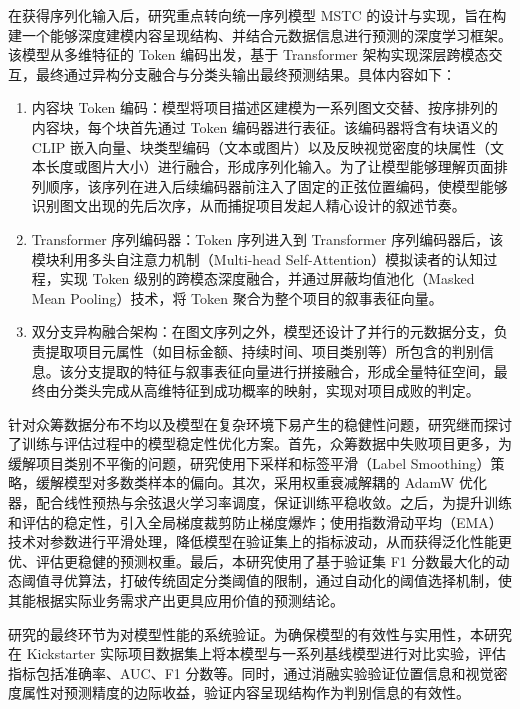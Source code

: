 在获得序列化输入后，研究重点转向统一序列模型 MSTC 的设计与实现，旨在构建一个能够深度建模内容呈现结构、并结合元数据信息进行预测的深度学习框架。该模型从多维特征的 Token 编码出发，基于 Transformer 架构实现深层跨模态交互，最终通过异构分支融合与分类头输出最终预测结果。具体内容如下：

\begin{enumerate}
\def\labelenumi{(\arabic{enumi})}
\item
  内容块 Token 编码：模型将项目描述区建模为一系列图文交替、按序排列的内容块，每个块首先通过 Token 编码器进行表征。该编码器将含有块语义的 CLIP 嵌入向量、块类型编码（文本或图片）以及反映视觉密度的块属性（文本长度或图片大小）进行融合，形成序列化输入。为了让模型能够理解页面排列顺序，该序列在进入后续编码器前注入了固定的正弦位置编码，使模型能够识别图文出现的先后次序，从而捕捉项目发起人精心设计的叙述节奏。
\item
  Transformer 序列编码器：Token 序列进入到 Transformer 序列编码器后，该模块利用多头自注意力机制（Multi-head Self-Attention）模拟读者的认知过程，实现 Token 级别的跨模态深度融合，并通过屏蔽均值池化（Masked Mean Pooling）技术，将 Token 聚合为整个项目的叙事表征向量。
\item
  双分支异构融合架构：在图文序列之外，模型还设计了并行的元数据分支，负责提取项目元属性（如目标金额、持续时间、项目类别等）所包含的判别信息。该分支提取的特征与叙事表征向量进行拼接融合，形成全量特征空间，最终由分类头完成从高维特征到成功概率的映射，实现对项目成败的判定。
\end{enumerate}

针对众筹数据分布不均以及模型在复杂环境下易产生的稳健性问题，研究继而探讨了训练与评估过程中的模型稳定性优化方案。首先，众筹数据中失败项目更多，为缓解项目类别不平衡的问题，研究使用下采样和标签平滑（Label Smoothing）策略，缓解模型对多数类样本的偏向。其次，采用权重衰减解耦的 AdamW 优化器，配合线性预热与余弦退火学习率调度，保证训练平稳收敛。之后，为提升训练和评估的稳定性，引入全局梯度裁剪防止梯度爆炸；使用指数滑动平均（EMA）技术对参数进行平滑处理，降低模型在验证集上的指标波动，从而获得泛化性能更优、评估更稳健的预测权重。最后，本研究使用了基于验证集 F1 分数最大化的动态阈值寻优算法，打破传统固定分类阈值的限制，通过自动化的阈值选择机制，使其能根据实际业务需求产出更具应用价值的预测结论。

研究的最终环节为对模型性能的系统验证。为确保模型的有效性与实用性，本研究在 Kickstarter 实际项目数据集上将本模型与一系列基线模型进行对比实验，评估指标包括准确率、AUC、F1 分数等。同时，通过消融实验验证位置信息和视觉密度属性对预测精度的边际收益，验证内容呈现结构作为判别信息的有效性。


